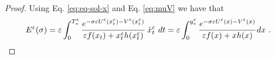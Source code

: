 \documentclass[reqno, 12pt, a4paper]{amsart}
\theoremstyle{plain}
\theoremstyle{definition}
\begin{document}
\begin{proof}

Using Eq. \eqref{eq:eq-sol-x} and Eq. \eqref{eq:muV} we have that
\begin{equation}
\begin{split}
E^\varepsilon(\sigma)&=\varepsilon \int_0^{T_*^\varepsilon} \cfrac{e^{-\sigma \varepsilon U^\varepsilon (x^\varepsilon_t) - V^\varepsilon (x^\varepsilon_t) }}{\varepsilon f(x_t) +x^\varepsilon_t h(x^\varepsilon_t)} \ {\dot x^\varepsilon}_t \ dt = \varepsilon \int_0^{y^\varepsilon_*} \cfrac{e^{-\sigma \varepsilon U^\varepsilon (x) - V^\varepsilon (x) }}{\varepsilon f(x) +x h(x)} \, dx \ .
\end{split}
\end{equation}


\bigskip


\end{proof}
\end{document}
